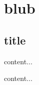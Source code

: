 \documentclass[12pt,t]{beamer}
\begin{document}
\section{blub}
\subsection{title}
\begin{frame}
content...
\end{frame}
\begin{frame}
content...
\end{frame}
\end{document}
